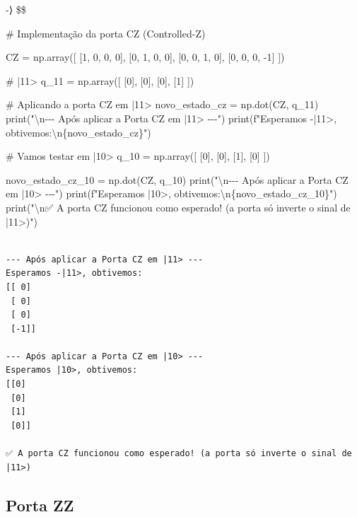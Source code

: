 \documentclass[
  brazilian,
]{report}
\newenvironment{Shaded}{\begin{snugshade}}{\end{snugshade}}
\newcommand{\NormalTok}[1]{\textcolor[rgb]{0.00,0.23,0.31}{#1}}
\begin{document}
-⟩ \$\$

\begin{Shaded}
\begin{Highlighting}[]

\NormalTok{\# Implementação da porta CZ (Controlled{-}Z)}

\NormalTok{CZ = np.array([}
\NormalTok{    [1, 0, 0, 0],}
\NormalTok{    [0, 1, 0, 0],}
\NormalTok{    [0, 0, 1, 0],}
\NormalTok{    [0, 0, 0, {-}1]}
\NormalTok{])}

\NormalTok{\# |11\textgreater{}}
\NormalTok{q\_11 = np.array([}
\NormalTok{    [0],}
\NormalTok{    [0],}
\NormalTok{    [0],}
\NormalTok{    [1]}
\NormalTok{])}

\NormalTok{\# Aplicando a porta CZ em |11\textgreater{}}
\NormalTok{novo\_estado\_cz = np.dot(CZ, q\_11)}
\NormalTok{print("\textbackslash{}n{-}{-}{-} Após aplicar a Porta CZ em |11\textgreater{} {-}{-}{-}")}
\NormalTok{print(f"Esperamos {-}|11\textgreater{}, obtivemos:\textbackslash{}n\{novo\_estado\_cz\}")}

\NormalTok{\# Vamos testar em |10\textgreater{}}
\NormalTok{q\_10 = np.array([}
\NormalTok{    [0],}
\NormalTok{    [0],}
\NormalTok{    [1],}
\NormalTok{    [0]}
\NormalTok{])  }

\NormalTok{novo\_estado\_cz\_10 = np.dot(CZ, q\_10)}
\NormalTok{print("\textbackslash{}n{-}{-}{-} Após aplicar a Porta CZ em |10\textgreater{} {-}{-}{-}")}
\NormalTok{print(f"Esperamos |10\textgreater{}, obtivemos:\textbackslash{}n\{novo\_estado\_cz\_10\}")}
\NormalTok{print("\textbackslash{}n✅ A porta CZ funcionou como esperado! (a porta só inverte o sinal de |11\textgreater{})")}
\end{Highlighting}
\end{Shaded}

\begin{verbatim}

--- Após aplicar a Porta CZ em |11> ---
Esperamos -|11>, obtivemos:
[[ 0]
 [ 0]
 [ 0]
 [-1]]

--- Após aplicar a Porta CZ em |10> ---
Esperamos |10>, obtivemos:
[[0]
 [0]
 [1]
 [0]]

✅ A porta CZ funcionou como esperado! (a porta só inverte o sinal de |11>)
\end{verbatim}

\subsection{Porta ZZ}\label{porta-zz}
\end{document}
